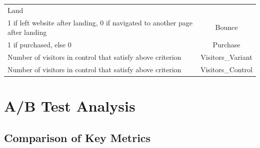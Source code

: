 \documentclass[12pt,oneside]{dukestatscithesis}
\theoremstyle{definition}
\theoremstyle{definition}
\theoremstyle{definition}
\theoremstyle{remark}
\begin{document}
\begin{longtable}[]{@{}lc@{}}
\begin{minipage}[t]{0.24\columnwidth}
Land\strut
\end{minipage}\tabularnewline
\begin{minipage}[t]{0.60\columnwidth}\raggedright\strut
1 if left website after landing, 0 if navigated to another page after
landing\strut
\end{minipage} & \begin{minipage}[t]{0.24\columnwidth}\centering\strut
Bounce\strut
\end{minipage}\tabularnewline
\begin{minipage}[t]{0.60\columnwidth}\raggedright\strut
1 if purchased, else 0\strut
\end{minipage} & \begin{minipage}[t]{0.24\columnwidth}\centering\strut
Purchase\strut
\end{minipage}\tabularnewline
\begin{minipage}[t]{0.60\columnwidth}\raggedright\strut
Number of visitors in control that satisfy above criterion\strut
\end{minipage} & \begin{minipage}[t]{0.24\columnwidth}\centering\strut
Visitors\_Variant\strut
\end{minipage}\tabularnewline
\begin{minipage}[t]{0.60\columnwidth}\raggedright\strut
Number of visitors in control that satisfy above criterion\strut
\end{minipage} & \begin{minipage}[t]{0.24\columnwidth}\centering\strut
Visitors\_Control\strut
\end{minipage}\tabularnewline
\bottomrule
\end{longtable}
\chapter{A/B Test Analysis}\label{rmd-basics}

\section{Comparison of Key Metrics}\label{comparison-of-key-metrics}
\end{document}

